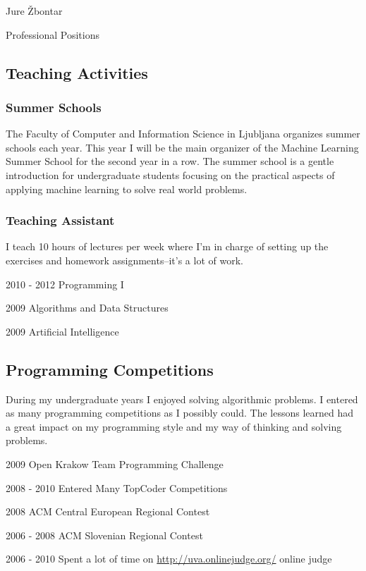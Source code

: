 \documentclass[12pt,a4paper]{article}
\begin{document}
\begin{cv}{Jure Žbontar}
\begin{cvlist}{Professional Positions}
\end{cvlist}


\subsection*{Teaching Activities}

\subsubsection*{Summer Schools}
The Faculty of Computer and Information Science in Ljubljana organizes summer
schools each year. This year I will be the main organizer of the Machine
Learning Summer School for the second year in a row. The summer school is a
gentle introduction for undergraduate students focusing on the practical
aspects of applying machine learning to solve real world problems. 

\subsubsection*{Teaching Assistant}
I teach 10 hours of lectures per week where I'm in charge of setting up the
exercises and homework assignments--it's a lot of work.

\begin{cvlist}{}
\item[2010 - 2012] Programming I
\item[2009] Algorithms and Data Structures
\item[2009] Artificial Intelligence
\end{cvlist}


\subsection*{Programming Competitions}
During my undergraduate years I enjoyed solving algorithmic problems. I entered
as many programming competitions as I possibly could. The lessons learned
had a great impact on my programming style and my way of thinking and solving problems.

\begin{cvlist}{}
\item[2009] Open Krakow Team Programming Challenge
\item[2008 - 2010] Entered Many TopCoder Competitions
\item[2008] ACM Central European Regional Contest
\item[2006 - 2008] ACM Slovenian Regional Contest
\item[2006 - 2010] Spent a lot of time on \url{http://uva.onlinejudge.org/} online judge
\end{cvlist}


\end{cv}
\end{document}
